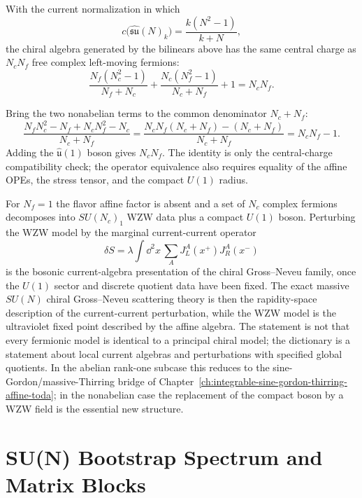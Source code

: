 \begin{remark}
\label{rem:nonabelian-bosonization-central-charge}
With the current normalization in which
\[
  c\bigl(\widehat{\mathfrak{su}}(N)_k\bigr)
  =
  \frac{k(N^2-1)}{k+N},
\]
the chiral algebra generated by the bilinears above has the same central
charge as \(N_cN_f\) free complex left-moving fermions:
\begin{equation}
  \frac{N_f(N_c^2-1)}{N_f+N_c}
  +
  \frac{N_c(N_f^2-1)}{N_c+N_f}
  +1
  =
  N_cN_f .
  \label{eq:nonabelian-bosonization-central-charge-identity}
\end{equation}
\end{remark}

Bring the two nonabelian terms to the common denominator \(N_c+N_f\):
\[
  \frac{
    N_fN_c^2-N_f+N_cN_f^2-N_c
  }{N_c+N_f}
  =
  \frac{N_cN_f(N_c+N_f)-(N_c+N_f)}{N_c+N_f}
  =
  N_cN_f-1 .
\]
Adding the \(\widehat{\mathfrak u}(1)\) boson gives \(N_cN_f\).  The identity
is only the central-charge compatibility check; the operator equivalence also
requires equality of the affine OPEs, the stress tensor, and the compact
\(U(1)\) radius.

For \(N_f=1\) the flavor affine factor is absent and a set of \(N_c\) complex
fermions decomposes into \(SU(N_c)_1\) WZW data plus a compact \(U(1)\) boson.
Perturbing the WZW model by the marginal current-current operator
\begin{equation}
  \delta S
  =
  \lambda\int\dd^2x\,
  \sum_A J_L^A(x^+)J_R^A(x^-)
  \label{eq:nonabelian-current-current-gn-perturbation}
\end{equation}
is the bosonic current-algebra presentation of the chiral Gross--Neveu
family, once the \(U(1)\) sector and discrete quotient data have been fixed.
The exact massive \(SU(N)\) chiral Gross--Neveu scattering theory is then the
rapidity-space description of the current-current perturbation, while the WZW
model is the ultraviolet fixed point described by the affine algebra.  The
statement is not that every fermionic model is identical to a principal
chiral model; the
dictionary is a statement about local current algebras and perturbations with
specified global quotients.  In the abelian rank-one subcase this reduces to
the sine-Gordon/massive-Thirring bridge of
Chapter~\ref{ch:integrable-sine-gordon-thirring-affine-toda}; in the
nonabelian case the replacement of the compact boson by a WZW field is the
essential new structure.

\section{SU(N) Bootstrap Spectrum and Matrix Blocks}
\label{sec:su-n-bootstrap-spectrum-pcm-gn}

